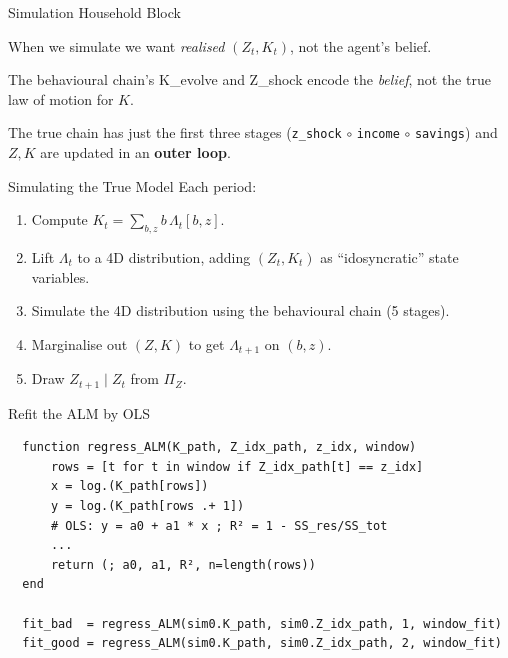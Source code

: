 \documentclass[10pt,aspectratio=169]{beamer}
\begin{document}
\begin{frame}{Simulation Household Block}

  When we simulate we want \emph{realised} $(Z_t, K_t)$, not the agent's belief.

  The behavioural chain's K\_evolve and Z\_shock encode the \emph{belief}, not the true law of motion for $K$.

  The true chain has just the first three stages (\texttt{z\_shock} $\circ$ \texttt{income} $\circ$ \texttt{savings}) and $Z, K$ are updated in an \textbf{outer loop}.
\end{frame}

\begin{frame}{Simulating the True Model}
  Each period:
  \begin{enumerate}
    \item Compute $K_t = \sum_{b, z} b\, \Lambda_t[b, z]$.
    \item Lift $\Lambda_t$ to a 4D distribution, adding $(Z_t, K_t)$ as ``idosyncratic'' state variables.
    \item Simulate the 4D distribution using the behavioural chain (5 stages).
    \item Marginalise out $(Z, K)$ to get $\Lambda_{t+1}$ on $(b, z)$.
    \item Draw $Z_{t+1} \mid Z_t$ from $\Pi_Z$.
  \end{enumerate}
\end{frame}

\begin{frame}[fragile]{Refit the ALM by OLS}
  \begin{lstlisting}
  function regress_ALM(K_path, Z_idx_path, z_idx, window)
      rows = [t for t in window if Z_idx_path[t] == z_idx]
      x = log.(K_path[rows])
      y = log.(K_path[rows .+ 1])
      # OLS: y = a0 + a1 * x ; R² = 1 - SS_res/SS_tot
      ...
      return (; a0, a1, R², n=length(rows))
  end

  fit_bad  = regress_ALM(sim0.K_path, sim0.Z_idx_path, 1, window_fit)
  fit_good = regress_ALM(sim0.K_path, sim0.Z_idx_path, 2, window_fit)
  \end{lstlisting}
\end{frame}
\end{document}
